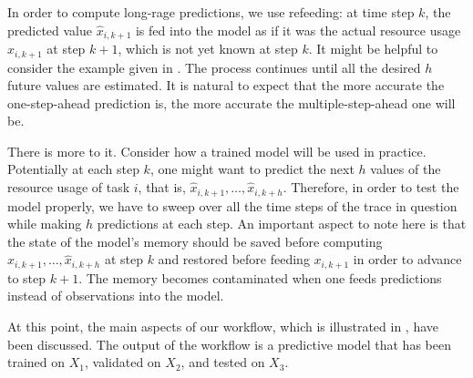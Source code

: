 In order to compute long-rage predictions, we use refeeding: at time step $k$,
the predicted value $\hat{x}_{i,k + 1}$ is fed into the model as if it was the
actual resource usage $x_{i,k + 1}$ at step $k + 1$, which is not yet known at
step $k$. It might be helpful to consider the example given in .
The process continues until all the desired $h$ future values are estimated. It
is natural to expect that the more accurate the one-step-ahead prediction is,
the more accurate the multiple-step-ahead one will be.

There is more to it. Consider how a trained model will be used in practice.
Potentially at each step $k$, one might want to predict the next $h$ values of
the resource usage of task $i$, that is, $\hat{x}_{i,k + 1}, \dots, \hat{x}_{i,k
+ h}$. Therefore, in order to test the model properly, we have to sweep over all
the time steps of the trace in question while making $h$ predictions at each
step. An important aspect to note here is that the state of the model's memory
should be saved before computing $\hat{x}_{i,k + 1}, \dots, \hat{x}_{i,k + h}$
at step $k$ and restored before feeding $x_{i,k + 1}$ in order to advance to
step $k + 1$. The memory becomes contaminated when one feeds predictions instead
of observations into the model.

At this point, the main aspects of our workflow, which is illustrated in
, have been discussed. The output of the workflow is a predictive
model that has been trained on $X_1$, validated on $X_2$, and tested on $X_3$.
